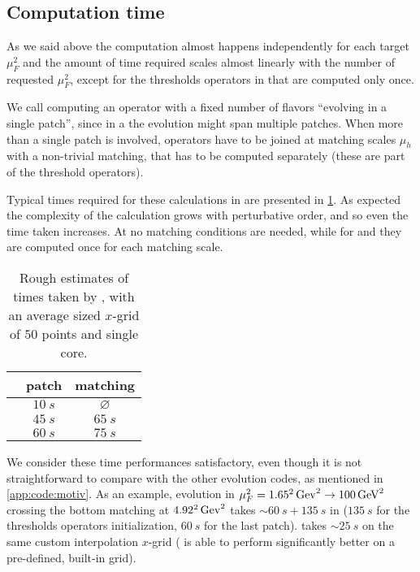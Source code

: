\subsection{Computation time}
\label{app:code:time}

As we said above the computation almost happens independently for each target $\mu_F^2$
and the amount of time required scales almost linearly with the number of requested
$\mu_F^2$, except for the thresholds operators in \vfns{} that are computed only once.

We call computing an operator with a fixed number of flavors \enquote{evolving
in a single patch}, since in a \vfns{} the evolution might span multiple patches.
When more than a single patch is involved, operators have to be joined at
matching scales $\mu_h$ with a non-trivial matching, that has to be
computed separately (these are part of the threshold operators).

Typical times required for these calculations in \eko{} are presented in
\cref{tab:time}.
As expected the complexity of the calculation grows with perturbative order,
and so even the time taken increases.
At \lo{} no matching conditions are needed, while for \nlo{} and
\nnlo{} they are computed once for each matching scale. 

\begin{table}[h]
    \centering
    \begin{tabular}{l|cc}
        & patch & matching \\
        \hline
        \lo{} & $\SI{10}{s}$ & $\varnothing$ \\
        \nlo{} & $\SI{45}{s}$ & $\SI{65}{s}$ \\
        \nnlo{} & $\SI{60}{s}$ & $\SI{75}{s}$ \\
    \end{tabular}
    \caption{Rough estimates of times taken by \eko{}, with an average sized
    $x$-grid of $50$ points and single core.}
    \label{tab:time}
\end{table}

We consider these time performances satisfactory, even though it is not
straightforward to compare \eko{} with the other evolution codes, as mentioned
in \cref{app:code:motiv}. As an example, \nnlo{}
evolution in $\mu_F^2 = \SI[parse-numbers=false]{1.65^2}{Gev^2} \to
\SI{100}{GeV^2}$ crossing the bottom matching at
$\SI[parse-numbers=false]{4.92^2}{Gev^2}$ takes $\sim \SI{60}{s} + \SI{135}{s}$
in \eko{} ($\SI{135}{s}$ for the thresholds operators initialization,
$\SI{60}{s}$ for the last patch). \apfel{} takes $\sim\SI{25}{s}$ on the same
custom interpolation $x$-grid (\apfel{} is able to perform significantly better
on a pre-defined, built-in grid).

